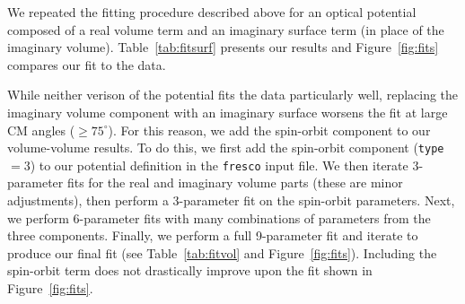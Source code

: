 \documentclass[]{scrartcl}
\begin{document}




\clearpage





We repeated the fitting procedure described above for an optical potential composed of a real volume term and an imaginary surface term (in place of the imaginary volume). Table~\ref{tab:fitsurf} presents our results and Figure~\ref{fig:fits} compares our fit to the data.

While neither verison of the potential fits the data particularly well, replacing the imaginary volume component with an imaginary surface worsens the fit at large CM angles ($\geq 75 ^{\circ}$). For this reason, we add the spin-orbit component to our volume-volume results. To do this, we first add the spin-orbit component (\texttt{type}$=3$) to our potential definition in the \texttt{fresco} input file. We then iterate 3-parameter fits for the real and imaginary volume parts (these are minor adjustments), then perform a 3-parameter fit on the spin-orbit parameters. Next, we perform 6-parameter fits with many combinations of parameters from the three components. Finally, we perform a full 9-parameter fit and iterate to produce our final fit (see Table~\ref{tab:fitvol} and Figure~\ref{fig:fits}). Including the spin-orbit term does not drastically improve upon the fit shown in Figure~\ref{fig:fits}.
\end{document}
